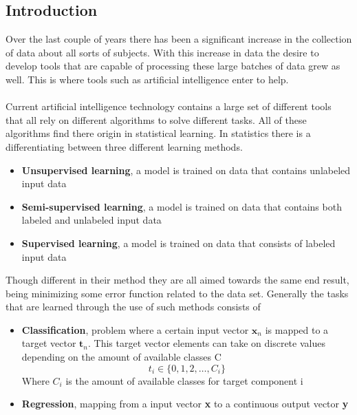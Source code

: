 \documentclass[12pt]{article}
\begin{document}
\subsection{Introduction}

Over the last couple of years there has been a significant increase in the collection of data about all sorts of subjects. With this increase in data the desire to develop tools that are capable of processing these large batches of data grew as well. This is where tools such as artificial intelligence enter to help. 
\\
\\
Current artificial intelligence technology contains a large set of different tools that all rely on different algorithms to solve different tasks. All of these algorithms find there origin in statistical learning. In statistics there is a differentiating between three different learning methods.\cite{Bishop2013}\cite{Haykin2008}\cite{Budumu}\cite{P.Murphy1991}\cite{TrevorHastie2009}
\begin{itemize}
	\item \textbf{Unsupervised learning}, a model is trained on data that contains unlabeled input data
	\item \textbf{Semi-supervised learning}, a model is trained on data that contains both labeled and unlabeled input data
	\item \textbf{Supervised learning}, a model is trained on data that consists of labeled input data
\end{itemize}
Though different in their method they are all aimed towards the same end result, being minimizing some error function related to the data set. Generally the tasks that are learned through the use of such methods consists of 
\begin{itemize}
	\item \textbf{Classification}, problem where a certain input vector $\textbf{x}_n$ is mapped to a target vector $\textbf{t}_n$. This target vector elements can take on discrete values depending on the amount of available classes  C
	\begin{equation*}
		t_i \in \{0,1,2,\dots, C_i\}
	\end{equation*}
	Where $C_i$ is the amount of available classes for target component i   
	\item \textbf{Regression}, mapping from a input vector \textbf{x} to a continuous output vector \textbf{y} 
\end{itemize} 
\\
\\
\end{document}
